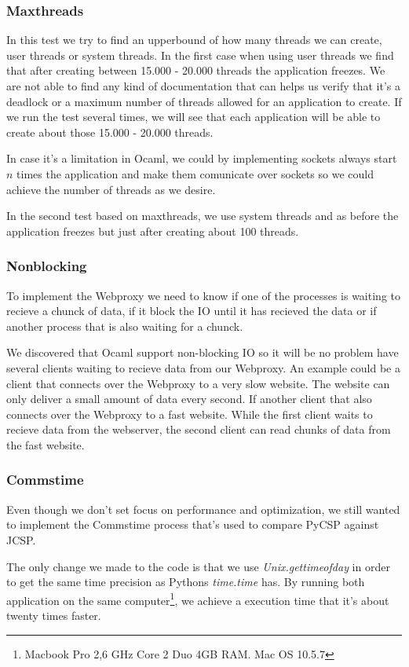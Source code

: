 \documentclass[a4paper,12pt]{article}
\begin{document}
\subsubsection*{Maxthreads}
In this test we try to find an upperbound of how many threads we can create,
user threads or system threads. In the first case when using user threads we
find that after creating between 15.000 - 20.000 threads the application
freezes. We are not able to find any kind of documentation that can helps us
verify that it's a deadlock or a maximum number of threads allowed for an
application to create. If we run the test several times, we will see that
each application will be able to create about those 15.000 - 20.000 threads.

In case it's a limitation in Ocaml, we could by implementing sockets always
start $n$ times the application and make them comunicate over sockets so we
could achieve the number of threads as we desire.

In the second test based on maxthreads, we use system threads and as before
the application freezes but just after creating about 100 threads.


\subsubsection*{Nonblocking}
To implement the Webproxy we need to know if one of the processes is waiting
to recieve a chunck of data, if it block the IO until it has recieved the data
or if another process that is also waiting for a chunck.

We discovered that Ocaml support non-blocking IO so it will be no problem have
several clients waiting to recieve data from our Webproxy. An example could
be a client that connects over the Webproxy to a very slow website. The website
can only deliver a small amount of data every second. If another client that
also connects over the Webproxy to a fast website. While the first client
waits to recieve data from the webserver, the second client can read chunks
of data from the fast website.


\subsubsection*{Commstime}
Even though we don't set focus on performance and optimization, we still wanted
to implement the Commstime\cite{vinterpycsp} process that's used to compare
PyCSP against JCSP.

The only change we made to the code is that we use {\it Unix.gettimeofday} in
order to get the same time precision as Pythons {\it time.time} has. By running
both application on the same computer\footnote{Macbook Pro 2,6 GHz Core 2 Duo
4GB RAM. Mac OS 10.5.7}, we achieve a execution time that it's about twenty
times faster.
\end{document}
